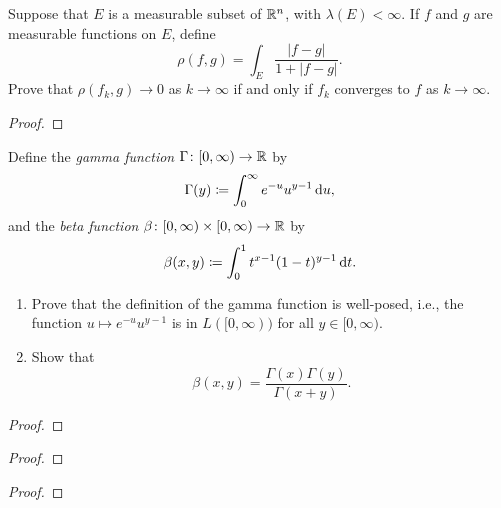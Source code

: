 \begin{problem}
Suppose that $E$ is a measurable subset of $\mathbb{R}^n$, with
$\lambda(E)<\infty$. If $f$ and $g$ are measurable functions on $E$, define
\[
\rho(f,g)=\int_E\frac{|f-g|}{1+|f-g|}.
\]
Prove that $\rho(f_k,g)\to 0$ as $k\to\infty$ if and only if $f_k$
converges to $f$ as $k\to\infty$.
\end{problem}
\begin{proof}
\end{proof}

\begin{problem}
Define the \emph{gamma function} $\Gamma\colon[0,\infty)\to\mathbb{R}$ by
\[
\Gamma(y)\coloneqq\int_0^\infty e^{-u}u^{y-1}\mathop{}\!\mathrm{d} u,
\]
and the \emph{beta function} $\beta\colon[0,\infty)\times[0,\infty)\to\mathbb{R}$
by
\[
\beta(x,y)\coloneqq\int_0^1 t^{x-1}(1-t)^{y-1}\mathop{}\!\mathrm{d} t.
\]
\begin{enumerate}[label=(\alph*)]
\item Prove that the definition of the gamma function is well-posed, i.e.,
  the function $u\mapsto e^{-u}u^{y-1}$ is in $L([0,\infty))$ for all
  $y\in[0,\infty)$.
\item Show that
\[
\beta(x,y)=\frac{\Gamma(x)\Gamma(y)}{\Gamma(x+y)}.
\]
\end{enumerate}
\end{problem}
\begin{proof}
\end{proof}

\begin{problem}
\end{problem}
\begin{proof}
\end{proof}

\begin{problem}
\end{problem}
\begin{proof}
\end{proof}


